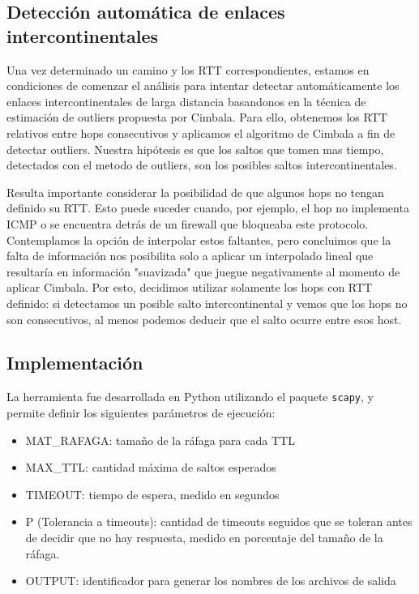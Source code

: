 \subsection{Detección automática de enlaces intercontinentales}

Una vez determinado un camino y los RTT correspondientes, estamos en condiciones de comenzar el análisis para intentar detectar automáticamente los enlaces intercontinentales de larga distancia basandonos en la técnica de estimación de outliers propuesta por Cimbala. Para ello, obtenemos los RTT relativos entre hops consecutivos y aplicamos el algoritmo de Cimbala a fin de detectar outliers. Nuestra hipótesis es que los saltos que tomen mas tiempo, detectados con el metodo de outliers, son los posibles saltos intercontinentales. 

Resulta importante considerar la posibilidad de que algunos hops no tengan definido su RTT. Esto puede suceder cuando, por ejemplo, el hop no implementa ICMP o se encuentra detrás de un firewall que bloqueaba este protocolo. Contemplamos la opción de interpolar estos faltantes, pero concluimos que la falta de información nos posibilita solo a aplicar un interpolado lineal que resultaría en información "suavizada"  que juegue negativamente al momento de aplicar Cimbala. Por esto, decidimos utilizar solamente los hops con RTT definido: si detectamos un posible salto intercontinental y vemos que los hops no son consecutivos, al menos podemos deducir que el salto ocurre entre esos host. 


\subsection{Implementación}

La herramienta fue desarrollada en Python utilizando el paquete \texttt{scapy}, y permite definir los siguientes parámetros de ejecución:
\begin{itemize}
	\item{MAT\_RAFAGA: tamaño de la ráfaga para cada TTL}
	\item{MAX\_TTL: cantidad máxima de saltos esperados}
	\item{TIMEOUT: tiempo de espera, medido en segundos }
	\item{P (Tolerancia a timeouts): cantidad de timeouts seguidos que se toleran antes de decidir que no hay respuesta, medido en porcentaje del tamaño de la ráfaga.}
	\item{OUTPUT: identificador para generar los nombres de los archivos de salida}
\end{itemize}

